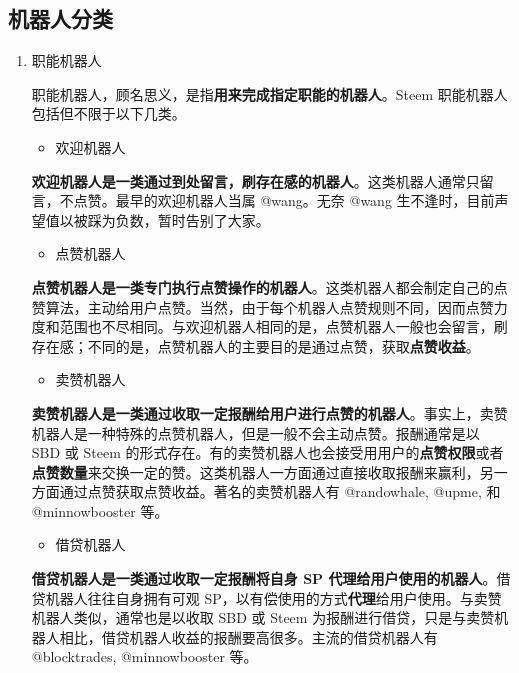 \documentclass[]{ctexbook}
\providecommand{\tightlist}{%
  \setlength{\itemsep}{0pt}\setlength{\parskip}{0pt}}
\begin{document}
\hypertarget{jqrfl}{%
\subsection{机器人分类}\label{jqrfl}}

\begin{enumerate}
\def\labelenumi{\arabic{enumi}.}
\item
  职能机器人

  职能机器人，顾名思义，是指\textbf{用来完成指定职能的机器人}。Steem 职能机器人包括但不限于以下几类。

  \begin{itemize}
  \tightlist
  \item
    欢迎机器人
  \end{itemize}

  \textbf{欢迎机器人是一类通过到处留言，刷存在感的机器人}。这类机器人通常只留言，不点赞。最早的欢迎机器人当属 @wang。无奈 @wang 生不逢时，目前声望值以被踩为负数，暂时告别了大家。

  \begin{itemize}
  \tightlist
  \item
    点赞机器人
  \end{itemize}

  \textbf{点赞机器人是一类专门执行点赞操作的机器人}。这类机器人都会制定自己的点赞算法，主动给用户点赞。当然，由于每个机器人点赞规则不同，因而点赞力度和范围也不尽相同。与欢迎机器人相同的是，点赞机器人一般也会留言，刷存在感；不同的是，点赞机器人的主要目的是通过点赞，获取\textbf{点赞收益}。

  \begin{itemize}
  \tightlist
  \item
    卖赞机器人
  \end{itemize}

  \textbf{卖赞机器人是一类通过收取一定报酬给用户进行点赞的机器人}。事实上，卖赞机器人是一种特殊的点赞机器人，但是一般不会主动点赞。报酬通常是以 SBD 或 Steem 的形式存在。有的卖赞机器人也会接受用用户的\textbf{点赞权限}或者\textbf{点赞数量}来交换一定的赞。这类机器人一方面通过直接收取报酬来赢利，另一方面通过点赞获取点赞收益。著名的卖赞机器人有 @randowhale, @upme, 和 @minnowbooster 等。

  \begin{itemize}
  \tightlist
  \item
    借贷机器人
  \end{itemize}

  \textbf{借贷机器人是一类通过收取一定报酬将自身 SP 代理给用户使用的机器人}。借贷机器人往往自身拥有可观 SP，以有偿使用的方式\textbf{代理}给用户使用。与卖赞机器人类似，通常也是以收取 SBD 或 Steem 为报酬进行借贷，只是与卖赞机器人相比，借贷机器人收益的报酬要高很多。主流的借贷机器人有 @blocktrades, @minnowbooster 等。


\end{enumerate}
\end{document}
